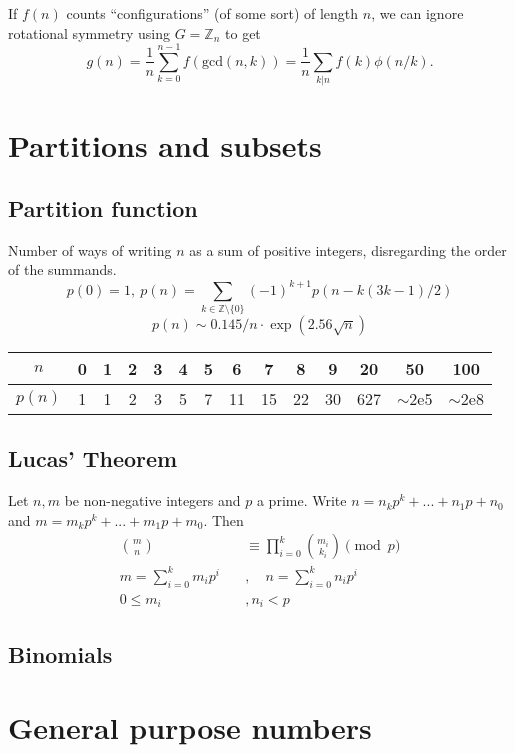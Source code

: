 		 If $f(n)$ counts ``configurations'' (of some sort) of length $n$, we can ignore rotational symmetry using $G = \mathbb Z_n$ to get
		 \[ g(n) = \frac 1 n \sum_{k=0}^{n-1}{f(\text{gcd}(n, k))} = \frac 1 n \sum_{k|n}{f(k)\phi(n/k)}. \]

		 
\section{Partitions and subsets}
	\subsection{Partition function}
		Number of ways of writing $n$ as a sum of positive integers, disregarding the order of the summands.
		\[ p(0) = 1,\ p(n) = \sum_{k \in \mathbb Z \setminus \{0\}}{(-1)^{k+1} p(n - k(3k-1) / 2)} \]
		\[ p(n) \sim 0.145 / n \cdot \exp(2.56 \sqrt{n}) \]

		\begin{center}
		\begin{tabular}{c|c@{\ }c@{\ }c@{\ }c@{\ }c@{\ }c@{\ }c@{\ }c@{\ }c@{\ }c@{\ }c@{\ }c@{\ }c}
			$n$    & 0 & 1 & 2 & 3 & 4 & 5 & 6  & 7  & 8  & 9  & 20  & 50  & 100 \\ \hline
			$p(n)$ & 1 & 1 & 2 & 3 & 5 & 7 & 11 & 15 & 22 & 30 & 627 & $\mathtt{\sim}$2e5 & $\mathtt{\sim}$2e8 \\
		\end{tabular}
		\end{center}

	\subsection{Lucas' Theorem}
		Let $n,m$ be non-negative integers and $p$ a prime. Write $n=n_kp^k+...+n_1p+n_0$ and $m=m_kp^k+...+m_1p+m_0$. Then 
		\begin{align*}
			\binom{m}{n} &\equiv \prod_{i=0}^{k} \binom{m_i}{k_i} \pmod{p} \\
			m = \sum_{i=0}^{k} m_i p^i \quad &, \quad n = \sum_{i=0}^{k} n_i p^i \\
			0 \leq m_i &, n_i < p
		\end{align*}

	\subsection{Binomials}

\section{General purpose numbers}
